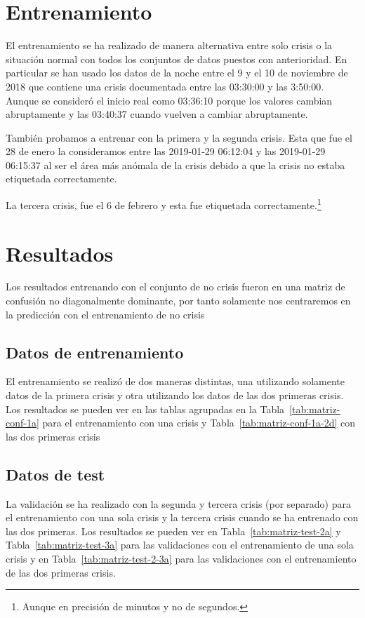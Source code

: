 \documentclass[a4paper,12pt,twoside,oldfontcommands]{memoir}
\begin{document}
\section{Entrenamiento}
El entrenamiento se ha realizado de manera alternativa entre solo crisis o la situación normal con todos los conjuntos de datos puestos con anterioridad. En particular se han usado los datos de la noche entre el 9 y el 10 de noviembre de 2018 que contiene una crisis documentada entre las 03:30:00 y las 3:50:00. Aunque se consideró el inicio real como 03:36:10 porque los valores cambian abruptamente y las 03:40:37 cuando vuelven a cambiar abruptamente. 

También probamos a entrenar con la primera y la segunda crisis. Esta que fue el 28 de enero la consideramos entre las 2019-01-29 06:12:04 y las 2019-01-29 06:15:37 al ser el área más anómala de la crisis debido a que la crisis no estaba etiquetada correctamente.

La tercera crisis, fue el 6 de febrero y esta fue etiquetada correctamente.\footnote{Aunque en precisión de minutos y no de segundos.}

\section{Resultados}
Los resultados entrenando con el conjunto de no crisis fueron en una matriz de confusión no diagonalmente dominante, por tanto solamente nos centraremos en la predicción con el entrenamiento de no crisis
\subsection{Datos de entrenamiento}
El entrenamiento se realizó de dos maneras distintas, una utilizando solamente datos de la primera crisis y otra utilizando los datos de las dos primeras crisis. Los resultados se pueden ver en las tablas agrupadas en la Tabla~\ref{tab:matriz-conf-1a} para el entrenamiento con una crisis y Tabla~\ref{tab:matriz-conf-1a-2d} con las dos primeras crisis


\subsection{Datos de test}
La validación se ha realizado con la segunda y tercera crisis (por separado) para el entrenamiento con una sola crisis y la tercera crisis cuando se ha entrenado con las dos primeras. Los resultados se pueden ver en Tabla~\ref{tab:matriz-test-2a} y Tabla~\ref{tab:matriz-test-3a} para las validaciones con el entrenamiento de una sola crisis y en Tabla~\ref{tab:matriz-test-2-3a} para las validaciones con el entrenamiento de las dos primeras crisis.

\end{document}
